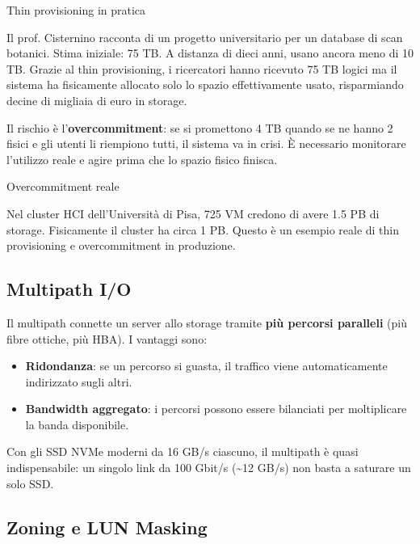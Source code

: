 \documentclass[
  italian,
  openany]{book}
\providecommand{\tightlist}{%
  \setlength{\itemsep}{0pt}\setlength{\parskip}{0pt}}
\begin{document}
\begin{callouttip}{Thin provisioning in pratica}

Il prof. Cisternino racconta di un progetto universitario per un
database di scan botanici. Stima iniziale: 75 TB. A distanza di dieci
anni, usano ancora meno di 10 TB. Grazie al thin provisioning, i
ricercatori hanno ricevuto 75 TB logici ma il sistema ha fisicamente
allocato solo lo spazio effettivamente usato, risparmiando decine di
migliaia di euro in storage.

\end{callouttip}

Il rischio è l'\textbf{overcommitment}: se si promettono 4 TB quando se
ne hanno 2 fisici e gli utenti li riempiono tutti, il sistema va in
crisi. È necessario monitorare l'utilizzo reale e agire prima che lo
spazio fisico finisca.

\begin{calloutnote}{Overcommitment reale}

Nel cluster HCI dell'Università di Pisa, 725 VM credono di avere 1.5 PB
di storage. Fisicamente il cluster ha circa 1 PB. Questo è un esempio
reale di thin provisioning e overcommitment in produzione.

\end{calloutnote}

\subsection{Multipath I/O}\label{multipath-io}

Il multipath connette un server allo storage tramite \textbf{più
percorsi paralleli} (più fibre ottiche, più HBA). I vantaggi sono:

\begin{itemize}
\tightlist
\item
  \textbf{Ridondanza}: se un percorso si guasta, il traffico viene
  automaticamente indirizzato sugli altri.
\item
  \textbf{Bandwidth aggregato}: i percorsi possono essere bilanciati per
  moltiplicare la banda disponibile.
\end{itemize}

Con gli SSD NVMe moderni da 16 GB/s ciascuno, il multipath è quasi
indispensabile: un singolo link da 100 Gbit/s (\textasciitilde12 GB/s)
non basta a saturare un solo SSD.

\subsection{Zoning e LUN Masking}\label{zoning-e-lun-masking}
\end{document}
